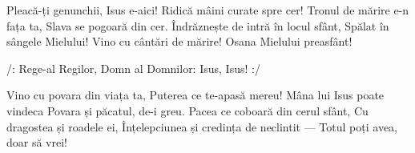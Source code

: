 \beginverse
Pleacă-ți genunchii, Isus e-aici!
Ridică mâini curate spre cer!
Tronul de mărire e-n fața ta,
Slava se pogoară din cer.
Îndrăznește de intră în locul sfânt,
Spălat în sângele Mielului!
Vino cu cântări de mărire!
Osana Mielului preasfânt!
\endverse

\beginchorus
/: Rege-al Regilor,
Domn al Domnilor:
Isus, Isus! :/
\endchorus

\beginverse
Vino cu povara din viața ta,
Puterea ce te-apasă mereu!
Mâna lui Isus poate vindeca
Povara și păcatul, de-i greu.
Pacea ce coboară din cerul sfânt,
Cu dragostea și roadele ei,
Înțelepciunea și credința de neclintit —
Totul poți avea, doar să vrei!
\endverse
\endsong